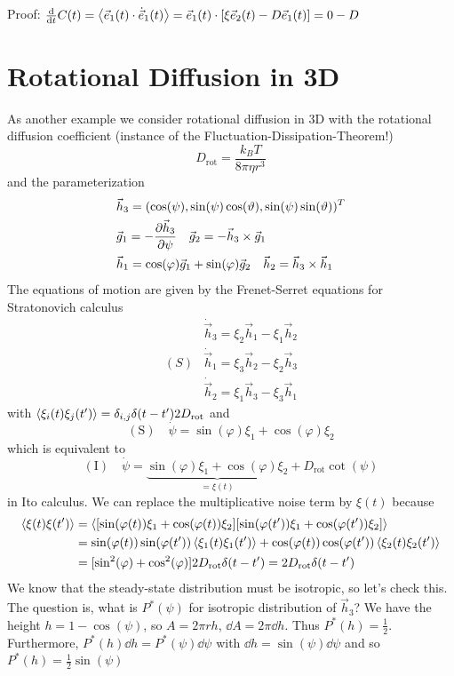 \documentclass{notebook}
\begin{document}
Proof: $\dv{t} C(t) = \expval{\vec{e}_1(t) \cdot \dot{\vec{e}}_1(t)} = \vec{e}_1(t) \cdot [\xi \vec{e}_2(t) - D \vec{e}_1(t)] = 0 - D$

\section{Rotational Diffusion in 3D}

As another example we consider rotational diffusion in 3D with the rotational diffusion coefficient (instance of the Fluctuation-Dissipation-Theorem!)
%
\begin{equation}
	D_{\mathrm{rot}} = \frac{k_B T}{8 \pi \eta r^3}
\end{equation}
%
and the parameterization
%
\begin{align*}
	& \vec{h}_3 = (\cos(\psi), \sin(\psi) \cos(\vartheta), \sin(\psi) \sin(\vartheta))^T \\
	& \vec{g}_1 = - \pdv{\vec{h}_3}{\psi} \quad \vec{g}_2 = - \vec{h}_3 \times \vec{g}_1 \\
	& \vec{h}_1 = \cos(\varphi) \vec{g}_1 + \sin(\varphi) \vec{g}_2 \quad \vec{h}_2 = \vec{h}_3 \times \vec{h}_1
\end{align*}
%
The equations of motion are given by the Frenet-Serret equations for Stratonovich calculus
%
\begin{eqnarray*}
& \dot{\vec{h}}_3 = \xi_2 \vec{h}_1 - \xi_1 \vec{h}_2 \\
(S) & \dot{\vec{h}}_1 = \xi_3 \vec{h}_2 - \xi_2 \vec{h}_3 \\
& \dot{\vec{h}}_2 =   \xi_1 \vec{h}_3 -\xi_3 \vec{h}_1
\end{eqnarray*}
%
with $\expval{\xi_i(t) \xi_j(t')} = \delta_{i,j} \delta(t-t') 2 D_{\mathrm{rot}}$ and
%
\begin{equation}
\mathrm{(S)} \quad \dot{\psi} = \sin(\varphi) \xi_1 + \cos(\varphi) \xi_2
\end{equation}
%
which is equivalent to
%
\begin{equation}
\mathrm{(I)} \quad \dot{\psi} = \underbrace{\sin(\varphi) \xi_1 + \cos(\varphi) \xi_2}_{= \xi(t)} + D_{\mathrm{rot}} \cot(\psi)
\end{equation}
%
in Ito calculus. We can replace the multiplicative noise term by $\xi(t)$ because
%
\begin{align*}
\expval{\xi(t) \xi(t')} &= \expval{[\sin(\varphi(t)) \xi_1 + \cos(\varphi(t)) \xi_2] [\sin(\varphi(t')) \xi_1 + \cos(\varphi(t')) \xi_2]} \\
&= \sin(\varphi(t))\sin(\varphi(t')) \expval{\xi_1(t) \xi_1(t')} + \cos(\varphi(t))\cos(\varphi(t')) \expval{\xi_2(t) \xi_2(t')} \\
&= [\sin^2(\varphi) + \cos^2(\varphi)] 2 D_{\mathrm{rot}} \delta(t-t') = 2 D_{\mathrm{rot}} \delta(t-t')
\end{align*}
%
We know that the steady-state distribution must be isotropic, so let's check this. The question is, what is $P^*(\psi)$ for isotropic distribution of $\vec{h}_3$? We have the height $h = 1- \cos(\psi)$, so $A = 2 \pi r h$, $\dd{A} = 2 \pi \dd{h}$. Thus $P^*(h) = \frac{1}{2}$. Furthermore, $P^*(h) \dd{h} = P^*(\psi) \dd{\psi}$ with $\dd{h} = \sin(\psi) \dd{\psi}$ and so $P^*(h) = \frac{1}{2} \sin(\psi)$
\end{document}
